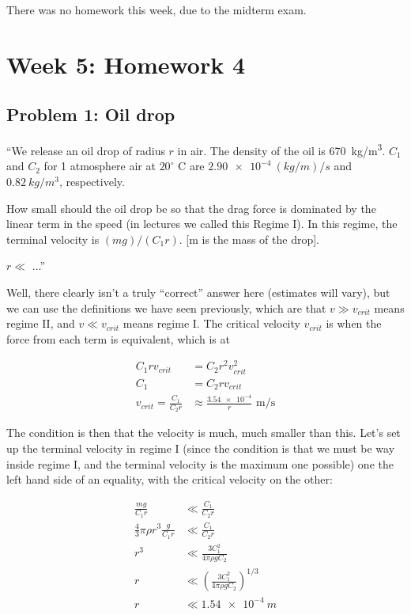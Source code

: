 \documentclass[12pt,a4paper]{report}
\begin{document}
There was no homework this week, due to the midterm exam.

\chapter{Week 5: Homework 4}

\section{Problem 1: Oil drop}

``We release an oil drop of radius $r$ in air. The density of the oil is \SI{670}{kg/m^3}. $C_1$ and $C_2$ for 1 atmosphere air at $20^\circ$ C are $\SI{2.90e-4}{(kg/m)/s}$ and $\SI{0.82}{kg/m^3}$, respectively.

How small should the oil drop be so that the drag force is dominated by the linear term in the speed (in lectures we called this Regime I). In this regime, the terminal velocity is $(m g)/(C_1 r)$. [m is the mass of the drop].

$r \ll$ ...''

Well, there clearly isn't a truly ``correct'' answer here (estimates will vary), but we can use the definitions we have seen previously, which are that $v \gg v_{crit}$ means regime II, and $v \ll v_{crit}$ means regime I. The critical velocity $v_{crit}$ is when the force from each term is equivalent, which is at

\begin{align}
C_1 r v_{crit} &= C_2 r^2 v_{crit}^2\\
C_1 &= C_2 r v_{crit}\\
v_{crit} = \frac{C_1}{C_2 r} &\approx \frac{\num{3.54e-4}}{r} \text{ m/s}
\end{align}

The condition is then that the velocity is much, much smaller than this. Let's set up the terminal velocity in regime I (since the condition is that we must be way inside regime I, and the terminal velocity is the maximum one possible) one the left hand side of an equality, with the critical velocity on the other:

\begin{align}
\frac{m g}{C_1 r} &\ll \frac{C_1}{C_2 r}\\
\frac{4}{3} \pi \rho r^3 \frac{g}{C_1 r} &\ll \frac{C_1}{C_2 r}\\
r^3 &\ll \frac{3 C_1^2}{4 \pi \rho g C_2}\\
r &\ll \left(\frac{3 C_1^2}{4 \pi \rho g C_2}\right)^{1/3}\\
r &\ll \SI{1.54e-4}{m}
\end{align}
\end{document}
